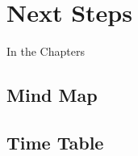\chapter{Next Steps}
\label{sec:nextsteps}

In the Chapters 

\section{Mind Map}

\section{Time Table}
